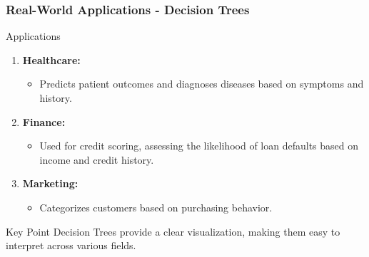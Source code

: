 \documentclass[aspectratio=169]{beamer}
\begin{document}
\begin{frame}[fragile]
    \frametitle{Real-World Applications - Decision Trees}

    \begin{block}{Applications}
        \begin{enumerate}
            \item \textbf{Healthcare:}
                \begin{itemize}
                    \item Predicts patient outcomes and diagnoses diseases based on symptoms and history.
                \end{itemize}
            \item \textbf{Finance:}
                \begin{itemize}
                    \item Used for credit scoring, assessing the likelihood of loan defaults based on income and credit history.
                \end{itemize}
            \item \textbf{Marketing:}
                \begin{itemize}
                    \item Categorizes customers based on purchasing behavior.
                \end{itemize}
        \end{enumerate}
    \end{block}
    
    \begin{block}{Key Point}
        Decision Trees provide a clear visualization, making them easy to interpret across various fields.
    \end{block}
\end{frame}
\end{document}

